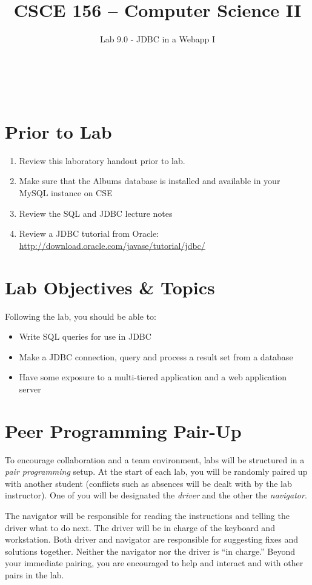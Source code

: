 \documentclass[12pt]{scrartcl}
\title{CSCE 156 -- Computer Science II}
\subtitle{Lab 9.0 - JDBC in a Webapp I}
\author{~}
\date{~}
\begin{document}
\maketitle

\section*{Prior to Lab}

\begin{enumerate}
  \item Review this laboratory handout prior to lab.
  \item Make sure that the Albums database is installed and available 
  	in your MySQL instance on CSE
  \item Review the SQL and JDBC lecture notes
  \item Review a JDBC tutorial from Oracle: \\
	\url{http://download.oracle.com/javase/tutorial/jdbc/}
\end{enumerate}

\section*{Lab Objectives \& Topics}
Following the lab, you should be able to:
\begin{itemize}
  \item Write SQL queries for use in JDBC
  \item Make a JDBC connection, query and process a result set from a database
  \item Have some exposure to a multi-tiered application and a web 
  	application server
\end{itemize}

\section*{Peer Programming Pair-Up}

To encourage collaboration and a team environment, labs will be
structured in a \emph{pair programming} setup.  At the start of
each lab, you will be randomly paired up with another student 
(conflicts such as absences will be dealt with by the lab instructor).
One of you will be designated the \emph{driver} and the other
the \emph{navigator}.  

The navigator will be responsible for reading the instructions and
telling the driver what to do next.  The driver will be in charge of the
keyboard and workstation.  Both driver and navigator are responsible
for suggesting fixes and solutions together.  Neither the navigator
nor the driver is ``in charge.''  Beyond your immediate pairing, you
are encouraged to help and interact and with other pairs in the lab.
\end{document}
